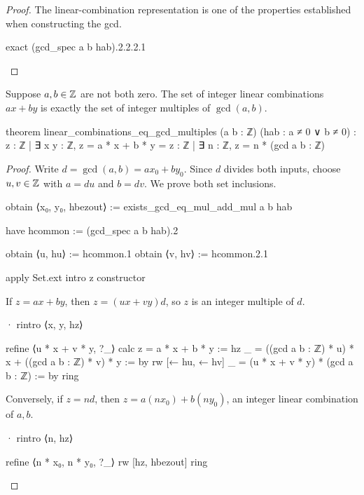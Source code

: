 \begin{proof}
  The linear-combination representation is one of the properties established when constructing the
  gcd.

  \begin{lean}
    exact (gcd_spec a b hab).2.2.2.1
  \end{lean}
\end{proof}

\begin{theorem}
  \label{ent:thm:gcd-linear-combinations}
  Suppose $a,b\in\mathbb{Z}$ are not both zero.
  The set of integer linear combinations $ax+by$ is exactly the set of integer multiples of
  $\gcd(a,b)$.

  \begin{lean}
    theorem linear_combinations_eq_gcd_multiples (a b : ℤ) (hab : a ≠ 0 ∨ b ≠ 0) :
        {z : ℤ | ∃ x y : ℤ, z = a * x + b * y} =
          {z : ℤ | ∃ n : ℤ, z = n * (gcd a b : ℤ)}
  \end{lean}
\end{theorem}

\begin{proof}
  Write $d=\gcd(a,b)=ax_{0}+by_{0}$.
  Since $d$ divides both inputs, choose $u,v\in\mathbb{Z}$ with $a=du$ and $b=dv$.
  We prove both set inclusions.

  \begin{lean}
    obtain ⟨x₀, y₀, hbezout⟩ := exists_gcd_eq_mul_add_mul a b hab

    have hcommon := (gcd_spec a b hab).2

    obtain ⟨u, hu⟩ := hcommon.1
    obtain ⟨v, hv⟩ := hcommon.2.1

    apply Set.ext
    intro z
    constructor
  \end{lean}

  If $z=ax+by$, then $z=(ux+vy)d$, so $z$ is an integer multiple of $d$.

  \begin{lean}
    · rintro ⟨x, y, hz⟩

      refine ⟨u * x + v * y, ?_⟩
      calc
        z = a * x + b * y := hz
        _ = ((gcd a b : ℤ) * u) * x + ((gcd a b : ℤ) * v) * y := by
          rw [← hu, ← hv]
        _ = (u * x + v * y) * (gcd a b : ℤ) := by
          ring
  \end{lean}

  Conversely, if $z=nd$, then $z=a(nx_{0})+b(ny_{0})$, an integer linear combination of $a,b$.

  \begin{lean}
    · rintro ⟨n, hz⟩

      refine ⟨n * x₀, n * y₀, ?_⟩
      rw [hz, hbezout]
      ring
  \end{lean}
\end{proof}

